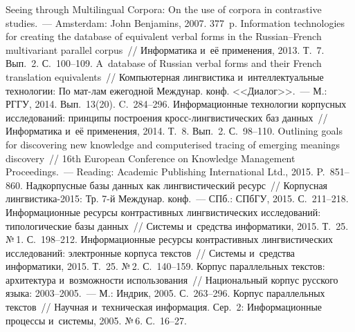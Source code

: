 \begin{multicols}{2}
{\small\frenchspacing
 {%
 \begin{thebibliography}{99}
 Seeing through Multilingual Corpora: 
On the use of corpora in contrastive 
studies.~--- Amsterdam: John Benjamins, 2007. 377~p.
 Information 
technologies for creating the database of equivalent verbal forms in the 
Russian--French 
multivariant parallel corpus~// Информатика и~её применения, 2013. Т.~7. Вып.~2.  
С.~100--109.
 A~database of Russian verbal forms and their French 
translation equivalents~// Компьютерная лингвистика и~интеллектуальные технологии: По 
мат-лам ежегодной Междунар. конф. <<Диалог>>.~--- М.: РГГУ, 2014. Вып.~13(20). 
C.~284--296.
 Информа\-ционные технологии корпусных 
исследований: принципы построения кросс-лингвистических баз данных~// Информатика 
и~её применения, 2014. Т.~8. Вып.~2. С.~98--110.
 Outlining goals for discovering new knowledge 
and computerised 
tracing of emerging meanings discovery~// 16th European Conference on Knowledge 
Management Proceedings.~--- Reading: Academic Publishing International Ltd., 2015. 
P.~851--860.
 Надкорпусные 
базы данных как лингвистический ресурс~// Корпусная лингвистика-2015: Тр. 7-й 
Междунар. конф.~--- СПб.: СПбГУ, 2015. С.~211--218.
 Информационные ресурсы контрастивных лингвистических 
исследований: типологические базы данных~// Системы и~средства информатики, 2015. 
Т.~25. №\,1. С.~198--212.
 Информационные ресурсы контрастивных лингвистических 
исследований: электронные корпуса текстов~// Системы и~средства информатики, 2015. 
Т.~25. №\,2. С.~140--159.
 Корпус параллельных текстов: 
архитектура и~возможности использования~// Национальный корпус русского языка: 
2003--2005.~--- М.: Индрик, 2005. С.~263--296.
 Корпус параллельных текстов~// 
Научная и~техническая информация. Сер.~2: Информационные процессы и~сис\-те\-мы, 2005. 
№\,6. С.~16--27.

\end{thebibliography}}}
\end{multicols}
